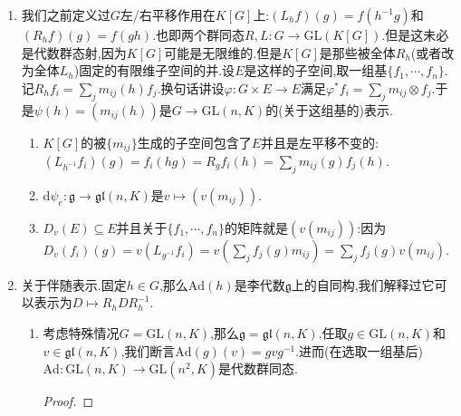 \begin{enumerate}
\begin{proof}
    	(1):有典范同构$\mathrm{T}_{(e,e)}(G\times G)\cong\mathrm{T}_eG\oplus\mathrm{T}_eG=\mathfrak{g}\oplus\mathfrak{g}$.取$f\in K[G]$,记$\mu^*f=\sum_if_i\otimes f_i'$.于是有$f(gg')=\sum_if_i(g)f_i'(g')$.进而有$f=\sum f_i'(e)f_i=\sum_if_i(e)f_i'$.任取$(v,w)\in\mathfrak{g}\oplus\mathfrak{g}$,就有:
    	\begin{align*}
    		\mathrm{d}\mu_{(e,e)}(v,w)(f)&=(v,w)\mu^*f\\&=(v,w)\sum_if_i\otimes f_i'\\&=\sum_iv(f_i)f_i'(e)+\sum_iw(f_i')f_i(e)\\&=(v+w)(f)
    	\end{align*}
    	(2):考虑复合$\xymatrix{G\ar[r]^{(1,l)}&G\times G\ar[r]^{\mu}&G}$.它是恒为$e$的同态,于是微分为零映射.于是有:
    	\begin{align*}
    		0&=\mathrm{d}(\mu\circ(1,l))_e(v)\\&=\mathrm{d}\mu_{e,e}\left(\mathrm{d}(1,l)_e(v)\right)\\&=\mathrm{d}\mu_{(e,e)}(v,\mathrm{d}l_e(v))\\&=v+\mathrm{d}l_e(v)
    	\end{align*}
    \end{proof}
    \item 我们之前定义过$G$左/右平移作用在$K[G]$上:$(L_hf)(g)=f(h^{-1}g)$和$(R_hf)(g)=f(gh)$.也即两个群同态$R,L:G\to\mathrm{GL}(K[G])$.但是这未必是代数群态射,因为$K[G]$可能是无限维的.但是$K[G]$是那些被全体$R_h$(或者改为全体$L_h$)固定的有限维子空间的并.设$E$是这样的子空间,取一组基$\{f_1,\cdots,f_n\}$.记$R_hf_i=\sum_jm_{ij}(h)f_j$.换句话讲设$\varphi:G\times E\to E$满足$\varphi^*f_i=\sum_jm_{ij}\otimes f_j$.于是$\psi(h)=(m_{ij}(h))$是$G\to\mathrm{GL}(n,K)$的(关于这组基的)表示.
    \begin{enumerate}[(1)]
    	\item $K[G]$的被$\{m_{ij}\}$生成的子空间包含了$E$并且是左平移不变的:$(L_{h^{-1}}f_i)(g)=f_i(hg)=R_gf_i(h)=\sum_jm_{ij}(g)f_j(h)$.
    	\item $\mathrm{d}\psi_e:\mathfrak{g}\to\mathfrak{gl}(n,K)$是$v\mapsto(v(m_{ij}))$.
    	\item $D_v(E)\subseteq E$并且关于$\{f_1,\cdots,f_n\}$的矩阵就是$(v(m_{ij}))$:因为$D_v(f_i)(g)=v(L_{g^{-1}}f_i)=v(\sum_jf_j(g)m_{ij})=\sum_jf_j(g)v(m_{ij})$.
    \end{enumerate}
    \item 关于伴随表示.固定$h\in G$,那么$\mathrm{Ad}(h)$是李代数$\mathfrak{g}$上的自同构,我们解释过它可以表示为$D\mapsto R_hDR_h^{-1}$.
    \begin{enumerate}[(1)]
    	\item 考虑特殊情况$G=\mathrm{GL}(n,K)$,那么$\mathfrak{g}=\mathfrak{gl}(n,K)$.任取$g\in\mathrm{GL}(n,K)$和$v\in\mathfrak{gl}(n,K)$,我们断言$\mathrm{Ad}(g)(v)=gvg^{-1}$.进而(在选取一组基后)$\mathrm{Ad}:\mathrm{GL}(n,K)\to\mathrm{GL}(n^2,K)$是代数群同态.
    	\begin{proof}
    		

\end{proof}
\end{enumerate}
\end{enumerate}

